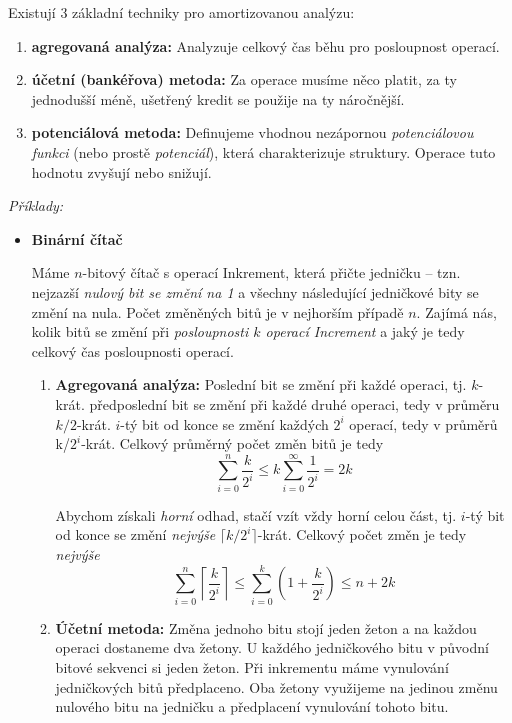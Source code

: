 \documentclass[11pt]{report} %
\numberwithin{equation}{section}
\begin{document}
Existují 3 základní techniky pro amortizovanou analýzu:
\begin{enumerate}
	\item \textbf{agregovaná analýza:} Analyzuje celkový čas běhu pro posloupnost operací.
	\item \textbf{účetní (bankéřova) metoda:} Za operace musíme něco platit, za ty jednodušší méně, ušetřený kredit se použije na ty náročnější.
	\item \textbf{potenciálová metoda:} Definujeme vhodnou nezápornou \textit{potenciálovou funkci} (nebo prostě \textit{potenciál}), která charakterizuje  struktury. Operace tuto hodnotu zvyšují nebo snižují.
\end{enumerate}

\noindent\textit{Příklady:}
\begin{itemize}
	\item \textbf{Binární čítač}
	
	Máme $n$-bitový čítač s operací Inkrement, která přičte jedničku -- tzn. nejzazší \textit{nulový bit se změní na 1} a všechny následující jedničkové bity se změní na nula. Počet změněných bitů je v nejhorším případě $n$. Zajímá nás, kolik bitů se změní při \textit{posloupnosti $k$ operací Increment} a jaký je tedy celkový čas posloupnosti operací.
	
	\begin{enumerate}
		\item \textbf{Agregovaná analýza:} Poslední bit se změní při každé operaci, tj. $k$-krát. předposlední bit se změní při každé druhé operaci, tedy v průměru $k/2$-krát. $i$-tý bit od konce se změní každých $2^i$ operací, tedy v průměrů k/$2^i$-krát. Celkový průměrný počet změn bitů je tedy $$\sum_{i=0}^{n}\frac{k}{2^i} \leq k \sum_{i=0}^{\infty} \frac{1}{2^i} = 2k$$
		
		Abychom získali \textit{horní} odhad, stačí vzít vždy horní celou část, tj. $i$-tý bit od konce se změní \textit{nejvýše} $\lceil k/2^i\rceil$-krát. Celkový počet změn je tedy \textit{nejvýše}
		$$\sum_{i=0}^{n}\left\lceil \frac{k}{2^i}\right\rceil \leq \sum_{i=0}^{k} (1 + \frac{k}{2^i}) \leq n + 2k$$
		\item \textbf{Účetní metoda:} Změna jednoho bitu stojí jeden žeton a na každou operaci dostaneme dva žetony. U každého jedničkového bitu v původní bitové sekvenci si  jeden žeton. Při inkrementu máme vynulování jedničkových bitů předplaceno. Oba žetony využijeme na jedinou změnu nulového bitu na jedničku a předplacení vynulování tohoto bitu. 
		

\end{enumerate}
\end{itemize}
\end{document}
